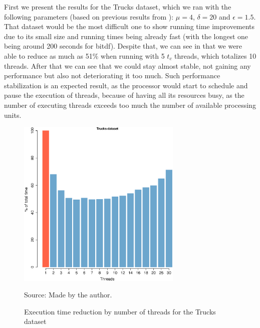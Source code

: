 {First we present the results for the Trucks dataset, which we ran with the following parameters (based on previous
results from ): $\mu=4$, $\delta=20$ and $\epsilon=1.5$. That dataset would be the most difficult one
to show running time improvements due to its small size and running times being already fast (with the longest one being
around 200 seconds for \ac{bitdf}). Despite that, we can see in  that we were able to reduce
as much as 51\% when running with 5 $t_c$ threads, which totalizes 10 threads. After that we can see that we could stay
almost stable, not gaining any performance but also not deteriorating it too much. Such performance stabilization is an
expected result, as the processor would start to schedule and pause the execution of threads, because of having all its
resources busy, as the number of executing threads exceeds too much the number of available processing units.

\begin{figure}[h!]
    \centering
    \caption{Execution time reduction by number of threads for the Trucks dataset}
    \centerline{\includegraphics[width=0.7\textwidth]{images/Trucks_thread.eps}}
    \footnotesize{Source: Made by the author.}
    \label{fig:trucks_threads}
\end{figure}

}

